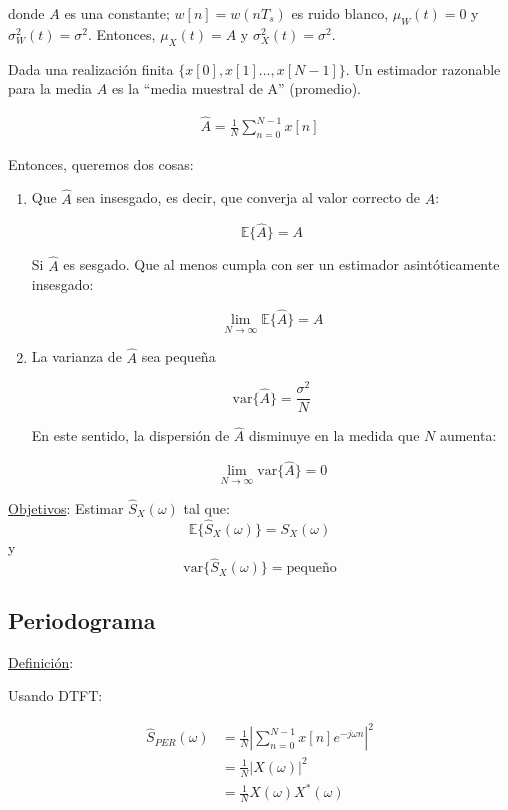 donde $A$ es una constante; $w[n] = w(nT_s)$ es ruido blanco, $\mu_W(t) = 0$ y $\sigma_W^2(t) = \sigma^2$. Entonces, $\mu_X(t) = A$ y $\sigma_X^2(t) =  \sigma^2$.\\

\par Dada una realización finita $\{x[0],x[1]...,x[N-1]\}$. Un estimador razonable para la media $A$ es la ``media muestral de A'' (promedio).

\begin{align*}
    \hat{A} = \frac{1}{N} \sum_{n=0}^{N-1}x[n]
\end{align*}

\par Entonces, queremos dos cosas:

\begin{enumerate}
    \item Que $\hat{A}$ sea insesgado, es decir, que converja al valor correcto de $A$: 
    
    $$\mathbb{E}\{\hat{A}\}=A$$
    
    Si $\hat{A}$ es sesgado. Que al menos cumpla con ser un estimador asintóticamente insesgado:
    
    $$\lim_{N\to\infty} \mathbb{E}\{\hat{A}\}=A$$
    
    \item La varianza de $\hat{A}$ sea pequeña
    
    $$\text{var}\{\hat{A}\} = \frac{\sigma^2}{N}$$ 

    En este sentido, la dispersión de $\hat{A}$ disminuye en la medida que $N$ aumenta:

    $$\lim_{N\to\infty} \text{var}\{\hat{A}\} = 0$$
    
\end{enumerate}

\underline{Objetivos}: Estimar $\hat{S}_X(\omega)$ tal que:
$$\mathbb{E}\{\hat{S}_X(\omega)\}=S_X(\omega) $$ y 
$$\text{var}\{\hat{S}_X(\omega)\}=\text{pequeño} $$ 

\subsection{Periodograma}

\underline{Definición}: 

Usando DTFT:

\begin{align*}
    \hat{S}_{PER}(\omega) &= \frac{1}{N} \left| \sum_{n=0}^{N-1} x[n] e^{-j \omega n} \right|^2
    \\
    & = \frac{1}{N} |X(\omega)|^2\\
    & = \frac{1}{N} X(\omega) X^*(\omega)
\end{align*}

